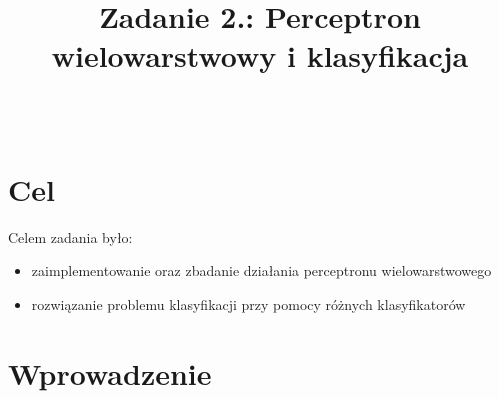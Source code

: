 \documentclass{classrep}
\author{%
	\studentinfo[216782@edu.p.lodz.pl]{Konrad Jaworski}{216782}\\
	\studentinfo[216866@edu.p.lodz.pl]{Jakub Plich}{216866}%
}
\title{Zadanie 2.: Perceptron wielowarstwowy i klasyfikacja}
\begin{document}
	\maketitle
	\thispagestyle{fancyplain}
	
	\section{Cel}
	{
		Celem zadania było:
		\begin{itemize}
			\item zaimplementowanie oraz zbadanie działania perceptronu wielowarstwowego
			\item rozwiązanie problemu klasyfikacji przy pomocy różnych klasyfikatorów
		\end{itemize}
	}
	
	\section{Wprowadzenie}
\end{document}
